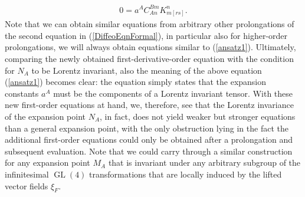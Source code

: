 \begin{align}\label{ansatz1}
    0 = a^A C^{Bm}_{An}  K_{m[rs]}^n.
\end{align}
Note that we can obtain similar equations from arbitrary other prolongations of the second equation in (\ref{DiffeoEqnFormal}), in particular also for higher-order prolongations, we will always obtain equations similar to (\ref{ansatz1}). Ultimately, comparing the newly obtained first-derivative-order equation with the condition for $N_A$ to be Lorentz invariant, also the meaning of the above equation (\ref{ansatz1}) becomes clear: the equation simply states that the expansion constants $a^A$ must be the components of a Lorentz invariant tensor. With these new first-order equations at hand, we, therefore, see that the Lorentz invariance of the expansion point $N_A$, in fact, does not yield weaker but stronger equations than a general expansion point, with the only obstruction lying in the fact the additional first-order equations could only be obtained after a prolongation and subsequent evaluation. Note that we could carry through a similar construction for any expansion point $M_A$ that is invariant under any arbitrary subgroup of the infinitesimal $\operatorname{GL}(4)$ transformations that are locally induced by the lifted vector fields $\xi_F$. 

